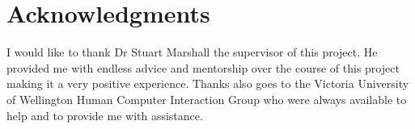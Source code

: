 \chapter*{Acknowledgments}
I would like to thank Dr Stuart Marshall the supervisor of this project. He provided
me with endless advice and mentorship over the course of this project making it
a very positive experience. Thanks also goes to the Victoria University of
Wellington Human Computer Interaction Group who were always available to help and to provide me with assistance.
